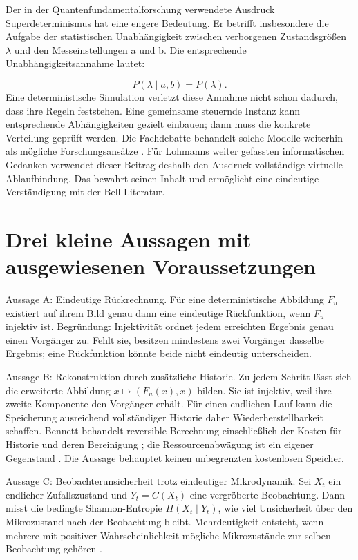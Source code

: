 Der in der Quantenfundamentalforschung verwendete Ausdruck Superdeterminismus hat eine engere Bedeutung. Er betrifft insbesondere die Aufgabe der statistischen Unabhängigkeit zwischen verborgenen Zustandsgrößen \(\lambda\) und den Messeinstellungen a und b. Die entsprechende Unabhängigkeitsannahme lautet:

\begin{equation}\label{de:eq2}
P(\lambda\mid a,b)=P(\lambda).
\end{equation}
Eine deterministische Simulation verletzt diese Annahme nicht schon dadurch, dass ihre Regeln feststehen. Eine gemeinsame steuernde Instanz kann entsprechende Abhängigkeiten gezielt einbauen; dann muss die konkrete Verteilung geprüft werden. Die Fachdebatte behandelt solche Modelle weiterhin als mögliche Forschungsansätze \cite{10}. Für Lohmanns weiter gefassten informatischen Gedanken verwendet dieser Beitrag deshalb den Ausdruck vollständige virtuelle Ablaufbindung. Das bewahrt seinen Inhalt und ermöglicht eine eindeutige Verständigung mit der Bell-Literatur.

\section{Drei kleine Aussagen mit ausgewiesenen Voraussetzungen}\label{de:sec3}
Aussage A: Eindeutige Rückrechnung. Für eine deterministische Abbildung \(F_u\) existiert auf ihrem Bild genau dann eine eindeutige Rückfunktion, wenn \(F_u\) injektiv ist. Begründung: Injektivität ordnet jedem erreichten Ergebnis genau einen Vorgänger zu. Fehlt sie, besitzen mindestens zwei Vorgänger dasselbe Ergebnis; eine Rückfunktion könnte beide nicht eindeutig unterscheiden.

Aussage B: Rekonstruktion durch zusätzliche Historie. Zu jedem Schritt lässt sich die erweiterte Abbildung \(x\mapsto (F_u(x),x)\) bilden. Sie ist injektiv, weil ihre zweite Komponente den Vorgänger erhält. Für einen endlichen Lauf kann die Speicherung ausreichend vollständiger Historie daher Wiederherstellbarkeit schaffen. Bennett behandelt reversible Berechnung einschließlich der Kosten für Historie und deren Bereinigung \cite{6}; die Ressourcenabwägung ist ein eigener Gegenstand \cite{7}. Die Aussage behauptet keinen unbegrenzten kostenlosen Speicher.

Aussage C: Beobachterunsicherheit trotz eindeutiger Mikrodynamik. Sei \(X_t\) ein endlicher Zufallszustand und \(Y_t=C(X_t)\) eine vergröberte Beobachtung. Dann misst die bedingte Shannon-Entropie \(H(X_t\mid Y_t)\), wie viel Unsicherheit über den Mikrozustand nach der Beobachtung bleibt. Mehrdeutigkeit entsteht, wenn mehrere mit positiver Wahrscheinlichkeit mögliche Mikrozustände zur selben Beobachtung gehören \cite{8}.

